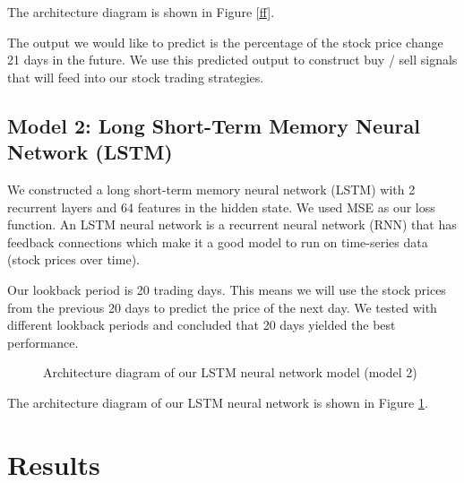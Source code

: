 \documentclass[10pt]{article}
\begin{document}
The architecture diagram is shown in Figure \ref{ff}.

The output we would like to predict is the percentage of the stock price change 21 days in the future. We use this predicted output to construct buy / sell signals that will feed into our stock trading strategies.



\subsection{Model 2: Long Short-Term Memory Neural Network (LSTM)}

We constructed a long short-term memory neural network (LSTM) with 2 recurrent layers and 64 features in the hidden state. We used MSE as our loss function. An LSTM neural network is a recurrent neural network (RNN) that has feedback connections which make it a good model to run on time-series data (stock prices over time).

Our lookback period is 20 trading days. This means we will use the stock prices from the previous 20 days to predict the price of the next day. We tested with different lookback periods and concluded that 20 days yielded the best performance.

\begin{figure}[H]
\centering
{}
\caption{Architecture diagram of our LSTM neural network model (model 2)}
\label{lstm}
\end{figure}

The architecture diagram of our LSTM neural network is shown in Figure \ref{lstm}.



\section{Results}
\end{document}
